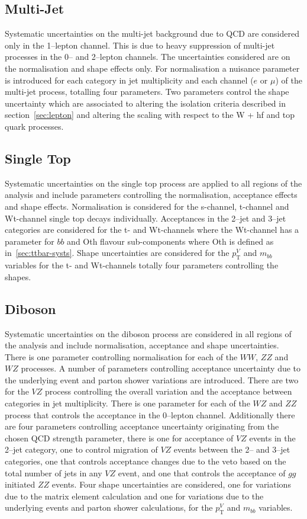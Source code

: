 \subsection{Multi-Jet}
Systematic uncertainties on the multi-jet background due to QCD are considered
only in the 1--lepton channel. This is due to heavy suppression of multi-jet
processes in the 0-- and 2--lepton channels. The uncertainties considered are on
the normalisation and shape effects only. For normalisation a nuisance parameter
is introduced for each category in jet multiplicity and each channel ($e$ or
$\mu$) of the multi-jet process, totalling four parameters. Two parameters
control the shape uncertainty which are associated to altering the isolation
criteria described in section~\ref{sec:lepton} and altering the scaling with
respect to the W + hf and top quark processes. 

\subsection{Single Top}
Systematic uncertainties on the single top process are applied to all regions of
the analysis and include parameters controlling the normalisation, acceptance
effects and shape effects. Normalisation is considered for the s-channel,
t-channel and Wt-channel single top decays individually. Acceptances in the
2--jet and 3--jet categories are considered for the t- and Wt-channels where the
Wt-channel has a parameter for $bb$ and Oth flavour sub-components where Oth is
defined as in~\ref{sec:ttbar-systs}. Shape uncertainties are considered for the
$p_{\mathrm{T}}^V$ and $m_{bb}$ variables for the t- and Wt-channels totally four
parameters controlling the shapes.

\subsection{Diboson}
Systematic uncertainties on the diboson process are considered in all regions of
the analysis and include normalisation, acceptance and shape uncertainties.
There is one parameter controlling normalisation for each of the $WW$, $ZZ$ and
$WZ$ processes. A number of parameters controlling acceptance uncertainty due to
the underlying event and parton shower variations are introduced. There are two
for the $VZ$ process controlling the overall variation and the acceptance
between categories in jet multiplicity. There is one parameter for each of the
$WZ$ and $ZZ$ process that controls the acceptance in the 0--lepton channel.
Additionally there are four parameters controlling acceptance uncertainty
originating from the chosen QCD strength parameter, there is one for acceptance
of $VZ$ events in the 2--jet category, one to control migration of $VZ$ events
between the 2-- and 3--jet categories, one that controls acceptance changes due
to the veto based on the total number of jets in any $VZ$ event, and one that
controls the acceptance of $gg$ initiated $ZZ$ events. Four shape uncertainties
are considered, one for variations due to the matrix element calculation and one
for variations due to the underlying events and parton shower calculations, for
the $p_{\mathrm{T}}^V$ and $m_{bb}$ variables.

